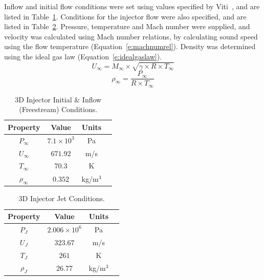 Inflow and initial flow conditions were set using values specified by Viti~\cite{schetz2009}, and are listed in Table~\ref{t:tc3:initial}. Conditions for the injector flow were also specified, and are listed in Table~\ref{t:tc3:jet}. Pressure, temperature and Mach number were supplied, and velocity was calculated using Mach number relations, by calculating sound speed using the flow temperature (Equation~\ref{e:machnumrel}). Density was determined using the ideal gas law (Equation~\ref{e:idealgaslaw}).
\begin{equation}
  \label{e:machnumrel}
  U_\infty = M_\infty \times \sqrt{\gamma \times R \times T_\infty}
\end{equation}
\begin{equation}
  \label{e:idealgaslaw}
  \rho_\infty = \frac{P_\infty}{R \times T_\infty}
\end{equation}
%
\begin{table}[htbp]

  \caption{3D Injector Initial \& Inflow (Freestream) Conditions.}
  \label{t:tc3:initial}
    \begin{center}
    \begin{tabular}{cccl}
  \hline\hline
     Property  & Value & Units \\
  \hline
    $P_\infty$  & $7.1\times10^3$ & Pa  \\
    $U_\infty$  & $671.92$ & m/s  \\
    $T_\infty$  & $70.3$ & K  \\
    $\rho_\infty$  & $0.352$ & kg/m$^3$  \\
  \hline\hline
  \end{tabular}
  \end{center}
\end{table}
%
%
\begin{table}[htbp]
  \caption{3D Injector Jet Conditions.}
  \label{t:tc3:jet}
  \begin{center}
  \begin{tabular}{cccl}
  \hline\hline
     Property  & Value & Units \\
  \hline
    $P_J$  & $2.006\times10^6$ & Pa  \\
    $U_J$  & $323.67$ & m/s  \\
    $T_J$  & $261$ & K \\
    $\rho_J$  & $26.77$ & kg/m$^3$  \\
  \hline\hline
  \end{tabular}
  \end{center}
\end{table}

